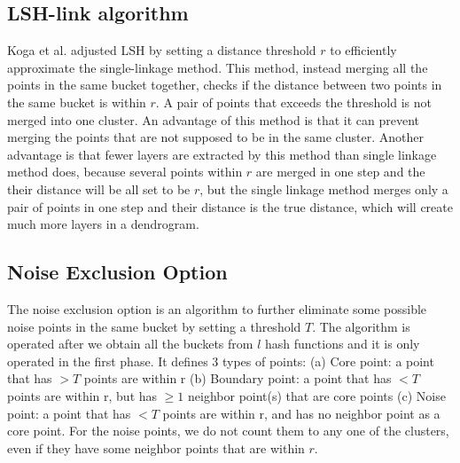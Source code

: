 \documentclass{report}
\begin{document}
\subsection*{LSH-link algorithm}
Koga et al. adjusted LSH by setting a distance threshold $r$ to efficiently approximate the single-linkage method. This method, instead merging all the points in the same bucket together, checks if the distance between two points in the same bucket is within $r$. A pair of points that exceeds the threshold is not merged into one cluster. An advantage of this method is that it can prevent merging the points that are not supposed to be in the same cluster. Another advantage is that fewer layers are extracted by this method than single linkage method does, because several points within $r$ are merged in one step and the their distance will be all set to be $r$, but the single linkage method merges only a pair of points in one step and their distance is the true distance, which will create much more layers in a dendrogram.

\subsection*{Noise Exclusion Option}
The noise exclusion option is an algorithm to further eliminate some possible noise points in the same bucket by setting a threshold $T$. The algorithm is operated after we obtain all the buckets from $l$ hash functions and it is only operated in the first phase. It defines 3 types of points: (a) Core point: a point that has $>T$ points are within r (b) Boundary point: a point that has $<T$ points are within r, but has $\geq 1$ neighbor point(s) that are core points (c) Noise point: a point that has $<T$ points are within r, and has no neighbor point as a core point. For the noise points, we do not count them to any one of the clusters, even if they have some neighbor points that are within $r$.
\end{document}
